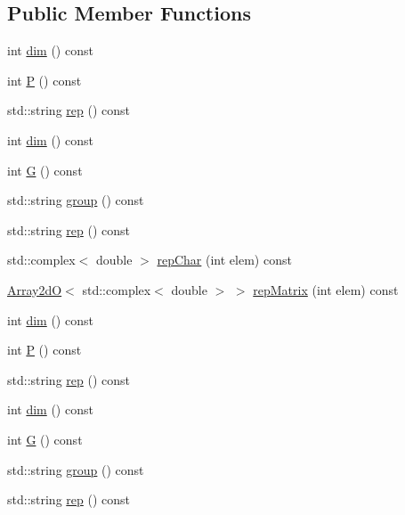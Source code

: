 \subsection*{Public Member Functions}
\begin{DoxyCompactItemize}
\item 
int \mbox{\hyperlink{structHadron_1_1HgRep_ad951f39b175b012e73b0f66217b25032}{dim}} () const
\item 
int \mbox{\hyperlink{structHadron_1_1HgRep_a56e901b36f34730192413d29c8c4c4a5}{P}} () const
\item 
std\+::string \mbox{\hyperlink{structHadron_1_1HgRep_a229b19e7f1d4fa443b715de9b5ed4454}{rep}} () const
\item 
int \mbox{\hyperlink{structHadron_1_1HgRep_ad951f39b175b012e73b0f66217b25032}{dim}} () const
\item 
int \mbox{\hyperlink{structHadron_1_1HgRep_a80baf377b3f2e8d633bba539efea8d04}{G}} () const
\item 
std\+::string \mbox{\hyperlink{structHadron_1_1HgRep_a271e1ec9a6f40512f32c8c573e42dff7}{group}} () const
\item 
std\+::string \mbox{\hyperlink{structHadron_1_1HgRep_a229b19e7f1d4fa443b715de9b5ed4454}{rep}} () const
\item 
std\+::complex$<$ double $>$ \mbox{\hyperlink{structHadron_1_1HgRep_a49537241226a4b230d73e72cb1a21de3}{rep\+Char}} (int elem) const
\item 
\mbox{\hyperlink{classADAT_1_1Array2dO}{Array2dO}}$<$ std\+::complex$<$ double $>$ $>$ \mbox{\hyperlink{structHadron_1_1HgRep_a1ca0a9c28a8e0a9aba561029b7e61f08}{rep\+Matrix}} (int elem) const
\item 
int \mbox{\hyperlink{structHadron_1_1HgRep_ad951f39b175b012e73b0f66217b25032}{dim}} () const
\item 
int \mbox{\hyperlink{structHadron_1_1HgRep_a56e901b36f34730192413d29c8c4c4a5}{P}} () const
\item 
std\+::string \mbox{\hyperlink{structHadron_1_1HgRep_a229b19e7f1d4fa443b715de9b5ed4454}{rep}} () const
\item 
int \mbox{\hyperlink{structHadron_1_1HgRep_ad951f39b175b012e73b0f66217b25032}{dim}} () const
\item 
int \mbox{\hyperlink{structHadron_1_1HgRep_a80baf377b3f2e8d633bba539efea8d04}{G}} () const
\item 
std\+::string \mbox{\hyperlink{structHadron_1_1HgRep_a271e1ec9a6f40512f32c8c573e42dff7}{group}} () const
\item 
std\+::string \mbox{\hyperlink{structHadron_1_1HgRep_a229b19e7f1d4fa443b715de9b5ed4454}{rep}} () const

\end{DoxyCompactItemize}

